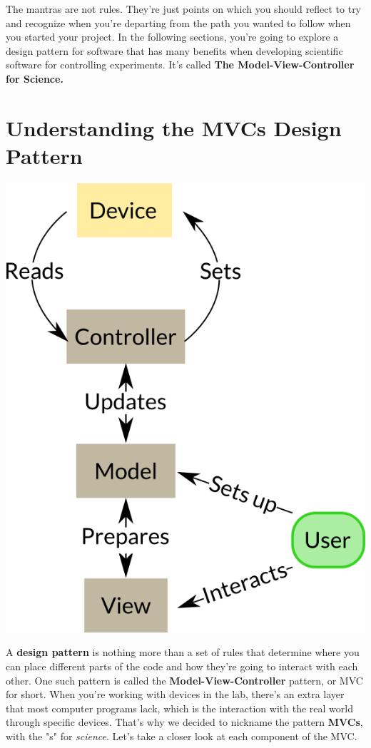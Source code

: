 The mantras are not rules. They're just points on which you should reflect to try and recognize when you're departing from the path you wanted to follow when you started your project. In the following sections, you're going to explore a design pattern for software that has many benefits when developing scientific software for controlling experiments. It's called \textbf{The Model-View-Controller for Science.}

\section{Understanding the MVCs Design Pattern}\label{sec:mvc}
\begin{center}
\includegraphics{images/Chapter_04/MVCs.png}
\end{center}

A \textbf{design pattern} is nothing more than a set of rules that determine where you can place different parts of the code and how they're going to interact with each other. One such pattern is called the \textbf{Model-View-Controller} pattern, or MVC for short. When you're working with devices in the lab, there's an extra layer that most computer programs lack, which is the interaction with the real world through specific devices. That's why we decided to nickname the pattern \textbf{MVCs}, with the "s" for \emph{science}. Let's take a closer look at each component of the MVC.

